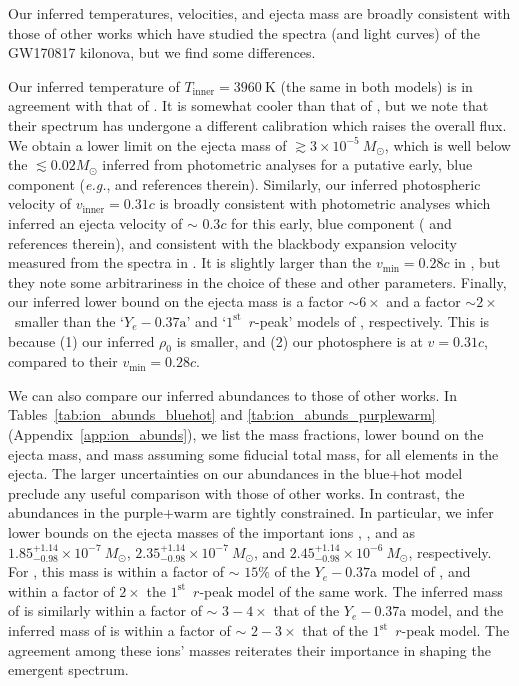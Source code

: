 \documentclass[twocolumn, twocolappendix]{aastex63}
\def\eg{{\it e.g.}}
\begin{document}
Our inferred temperatures, velocities, and ejecta mass are broadly consistent with those of other works which have studied the spectra (and light curves) of the GW170817 kilonova, but we find some differences. 

Our inferred temperature of $T_{\mathrm{inner}} = 3960~\mathrm{K}$ (the same in both models) is in agreement with that of \cite{watson19}. It is somewhat cooler than that of \cite{gillanders22}, but we note that their spectrum has undergone a different calibration which raises the overall flux. We obtain a lower limit on the ejecta mass of $\gtrsim$$3 \times 10^{-5}~M_{\odot}$, which is well below the $\lesssim$$0.02 M_{\odot}$ inferred from photometric analyses for a putative early, blue component (\eg, \citealt{drout17, villar17} and references therein). Similarly, our inferred photospheric velocity of $v_{\mathrm{inner}} = 0.31c$ is broadly consistent with photometric analyses which inferred an ejecta velocity of $\sim$ $0.3c$ for this early, blue component (\citealt{villar17} and references therein), and consistent with the blackbody expansion velocity measured from the spectra in \cite{watson19}. It is slightly larger than the $v_{\mathrm{min}} = 0.28c$ in \cite{gillanders22}, but they note some arbitrariness in the choice of these and other parameters. Finally, our inferred lower bound on the ejecta mass is a factor $\sim$$6 \times$ and a factor $\sim$$2 \times$~smaller than the `$Y_e-0.37 \mathrm{a}$' and `$1^{\mathrm{st}}$~$r$-peak' models of \cite{gillanders22}, respectively. This is because (1) our inferred $\rho_0$ is smaller, and (2) our photosphere is at $v = 0.31c$, compared to their $v_{\mathrm{min}} = 0.28c$. 

We can also compare our inferred abundances to those of other works. In Tables~\ref{tab:ion_abunds_bluehot} and \ref{tab:ion_abunds_purplewarm} (Appendix~\ref{app:ion_abunds}), we list the mass fractions, lower bound on the ejecta mass, and mass assuming some fiducial total mass, for all elements in the ejecta. The larger uncertainties on our abundances in the blue+hot model preclude any useful comparison with those of other works. In contrast, the abundances in the purple+warm are tightly constrained. In particular, we infer lower bounds on the ejecta masses of the important ions , , and  as $1.85^{+1.14}_{-0.98} \times 10^{-7}~M_{\odot}$, $2.35^{+1.14}_{-0.98} \times 10^{-7}~M_{\odot}$, and $2.45^{+1.14}_{-0.98} \times 10^{-6}~M_{\odot}$, respectively. For , this mass is within a factor of $\sim$ $15 \%$ of the $Y_e -0.37$a model of \cite{gillanders22}, and within a factor of $2 \times$ the $1^{\mathrm{st}}$~$r$-peak model of the same work. The inferred mass of  is similarly within a factor of $\sim$ $3 - 4 \times$ that of the $Y_e -0.37$a model, and the inferred mass of  is within a factor of $\sim$ $2 - 3 \times$ that of the $1^{\mathrm{st}}$~$r$-peak model. The agreement among these ions' masses reiterates their importance in shaping the emergent spectrum.
\end{document}
